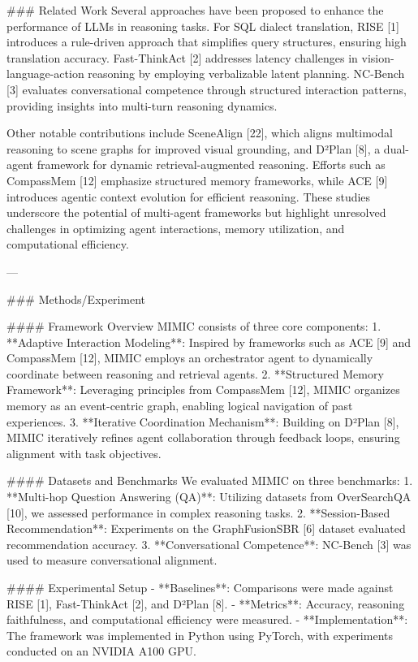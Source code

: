 ### Related Work
Several approaches have been proposed to enhance the performance of LLMs in reasoning tasks. For SQL dialect translation, RISE [1] introduces a rule-driven approach that simplifies query structures, ensuring high translation accuracy. Fast-ThinkAct [2] addresses latency challenges in vision-language-action reasoning by employing verbalizable latent planning. NC-Bench [3] evaluates conversational competence through structured interaction patterns, providing insights into multi-turn reasoning dynamics.

Other notable contributions include SceneAlign [22], which aligns multimodal reasoning to scene graphs for improved visual grounding, and D²Plan [8], a dual-agent framework for dynamic retrieval-augmented reasoning. Efforts such as CompassMem [12] emphasize structured memory frameworks, while ACE [9] introduces agentic context evolution for efficient reasoning. These studies underscore the potential of multi-agent frameworks but highlight unresolved challenges in optimizing agent interactions, memory utilization, and computational efficiency.

---

### Methods/Experiment

#### Framework Overview
MIMIC consists of three core components:
1. **Adaptive Interaction Modeling**: Inspired by frameworks such as ACE [9] and CompassMem [12], MIMIC employs an orchestrator agent to dynamically coordinate between reasoning and retrieval agents.
2. **Structured Memory Framework**: Leveraging principles from CompassMem [12], MIMIC organizes memory as an event-centric graph, enabling logical navigation of past experiences.
3. **Iterative Coordination Mechanism**: Building on D²Plan [8], MIMIC iteratively refines agent collaboration through feedback loops, ensuring alignment with task objectives.

#### Datasets and Benchmarks
We evaluated MIMIC on three benchmarks:
1. **Multi-hop Question Answering (QA)**: Utilizing datasets from OverSearchQA [10], we assessed performance in complex reasoning tasks.
2. **Session-Based Recommendation**: Experiments on the GraphFusionSBR [6] dataset evaluated recommendation accuracy.
3. **Conversational Competence**: NC-Bench [3] was used to measure conversational alignment.

#### Experimental Setup
- **Baselines**: Comparisons were made against RISE [1], Fast-ThinkAct [2], and D²Plan [8].
- **Metrics**: Accuracy, reasoning faithfulness, and computational efficiency were measured.
- **Implementation**: The framework was implemented in Python using PyTorch, with experiments conducted on an NVIDIA A100 GPU.

